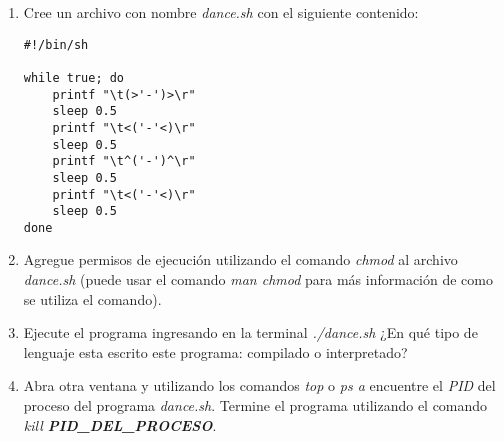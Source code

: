 \documentclass[12pt]{article}
\begin{document}
\begin{enumerate}

    \item Cree un archivo con nombre \emph{dance.sh} con el siguiente
        contenido:

        \begin{verbatim}
#!/bin/sh

while true; do
    printf "\t(>'-')>\r"
    sleep 0.5
    printf "\t<('-'<)\r"
    sleep 0.5
    printf "\t^('-')^\r"
    sleep 0.5
    printf "\t<('-'<)\r"
    sleep 0.5
done
        \end{verbatim}

    \item Agregue permisos de ejecución utilizando el comando \emph{chmod} al
        archivo \emph{dance.sh} (puede usar el comando \emph{man chmod} para
        más información de como se utiliza el comando).

    \item Ejecute el programa ingresando en la terminal \emph{./dance.sh} ¿En
        qué tipo de lenguaje esta escrito este programa: compilado o
        interpretado?

    \item Abra otra ventana y utilizando los comandos \emph{top} o \emph{ps a}
        encuentre el \emph{PID} del proceso del programa \emph{dance.sh}.
        Termine el programa utilizando el comando \emph{kill
        \textbf{PID\_DEL\_PROCESO}}.

\end{enumerate}
\end{document}
